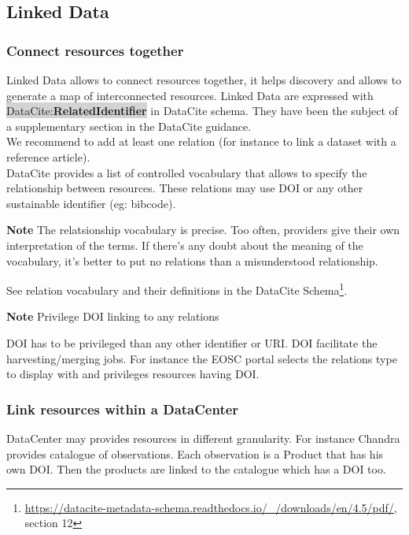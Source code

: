 \documentclass[11pt,a4paper]{ivoa}
\newcommand{\dataciteterm}[1]{\colorbox{lightgray}{DataCite:\textbf{#1}}}
\newcommand{\important}[1]{
	\begin{bigdescription}
		\item \color{ivoacolor}\textbf{Note} #1
	\end{bigdescription}
}
\begin{document}
\subsection{Linked Data}
\label{sec:linkeddata}
\subsubsection{Connect resources together}
Linked Data allows to connect resources together, it helps discovery and allows to generate a map of interconnected resources. 
Linked Data are expressed with \dataciteterm{RelatedIdentifier} in DataCite schema. They have been the subject of a supplementary section in the DataCite guidance.\\

We recommend to add at least one relation (for instance to link a dataset with a reference article).\\


DataCite provides a list of controlled vocabulary that allows to specify the relationship between resources.
These relations may use DOI or any other sustainable identifier (eg: bibcode).

\important{	
The relatsionship vocabulary is precise.
Too often, providers give their own interpretation of the terms.
If there's any doubt about the meaning of the vocabulary,
it's better to put no relations than a misunderstood relationship.
}

See relation vocabulary and their definitions in the DataCite Schema\footnote{\url{https://datacite-metadata-schema.readthedocs.io/_/downloads/en/4.5/pdf/}, section 12}.


\important{Privilege DOI linking to any relations}

DOI has to be privileged than any other identifier or URI. DOI facilitate the harvesting/merging jobs. For instance the EOSC portal selects the relations type to display with and privileges resources having DOI.

\subsubsection{Link resources within a DataCenter}
DataCenter may provides resources in different granularity. For instance Chandra provides catalogue of observations. Each observation is a Product that has his own DOI.
Then the products are linked to the catalogue which has a DOI too.
\end{document}
